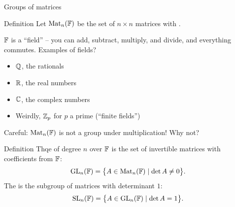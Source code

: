 \documentclass[8pt]{beamer}
\newcommand{\Pause}{}      %
\begin{document}
\begin{frame}{Groups of matrices} %
  
  \Pause
  
  \begin{block}{Definition}
    Let $\operatorname{Mat}_n(\mathbb{F})$ be the set of $n\times n$ matrices with
    .
  \end{block}

  \smallskip \pause

  $\mathbb{F}$ is a ``field'' -- you can add, subtract, multiply, and divide, and everything commutes. \pause Examples of fields? \pause
  \begin{itemize}
    \item $\mathbb{Q}$, the rationals
    \item $\mathbb{R}$, the real numbers
    \item $\mathbb{C}$, the complex numbers
    \item Weirdly, $\mathbb{Z}_p$ for $p$ a prime (``finite fields'')
  \end{itemize} \pause

  \begin{alertblock}{Careful:}
    $\operatorname{Mat}_n(\mathbb{F})$ is not a group under multiplication! \pause Why not?
  \end{alertblock}
  
  \begin{block}{Definition}
    Thqe  of degree $n$ over $\mathbb{F}$ is the
    set of invertible matrices with coefficients from $\mathbb{F}$:
    \[
    \operatorname{GL}_n(\mathbb{F})=\big\{A\in\operatorname{Mat}_n(\mathbb{F})\mid \det A\neq 0\big\}. 
    \]
    \Pause The  is the subgroup of matrices with
    determinant $1$:
    \[
    \operatorname{SL}_n(\mathbb{F})=\big\{A\in\operatorname{GL}_n(\mathbb{F})\mid\det A=1\big\}.
    \]
  \end{block}

\end{frame}

\end{document}
